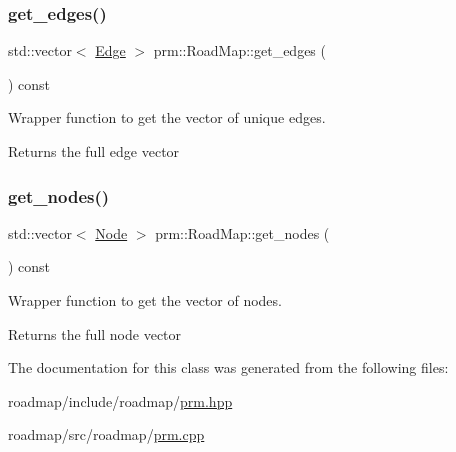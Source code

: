 \subsubsection{\texorpdfstring{get\+\_\+edges()}{get\_edges()}}
{\footnotesize\ttfamily std\+::vector$<$ \hyperlink{structprm_1_1Edge}{Edge} $>$ prm\+::\+Road\+Map\+::get\+\_\+edges (\begin{DoxyParamCaption}{ }\end{DoxyParamCaption}) const}



Wrapper function to get the vector of unique edges. 

\begin{DoxyReturn}{Returns}
the full edge vector 
\end{DoxyReturn}
\mbox{\label{classprm_1_1RoadMap_a9b8c5b9de9a678f1eb9a6ceaa9fd8bb0}} 
\subsubsection{\texorpdfstring{get\+\_\+nodes()}{get\_nodes()}}
{\footnotesize\ttfamily std\+::vector$<$ \hyperlink{structprm_1_1Node}{Node} $>$ prm\+::\+Road\+Map\+::get\+\_\+nodes (\begin{DoxyParamCaption}{ }\end{DoxyParamCaption}) const}



Wrapper function to get the vector of nodes. 

\begin{DoxyReturn}{Returns}
the full node vector 
\end{DoxyReturn}


The documentation for this class was generated from the following files\+:\begin{DoxyCompactItemize}
\item 
roadmap/include/roadmap/\hyperlink{prm_8hpp}{prm.\+hpp}\item 
roadmap/src/roadmap/\hyperlink{prm_8cpp}{prm.\+cpp}\end{DoxyCompactItemize}
